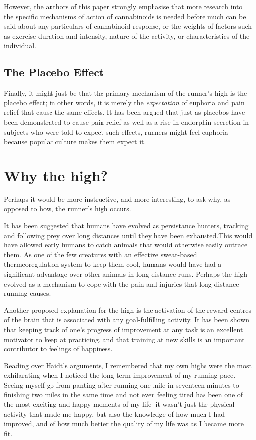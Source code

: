\documentclass[]{article}
\begin{document}
	However, the authors of this paper strongly emphasise that more research into the specific mechanisms of action of cannabinoids is needed before much can be said about any particulars of cannabinoid response, or the weights of factors such as exercise duration and intensity, nature of the activity, or characteristics of the individual. 
	
	\subsection{The Placebo Effect}
		Finally, it might just be that the primary mechanism of the runner's high is the placebo effect; in other words, it is merely the \emph{expectation} of euphoria and pain relief that cause the same effects. It has been argued \citep{placebo} that just as placebos have been demonstrated to cause pain relief as well as a rise in endorphin secretion in subjects who were told to expect such effects, runners might feel euphoria because popular culture makes them expect it.		
		
\section{Why the high?}
	Perhaps it would be more instructive, and more interesting, to ask why, as opposed to how, the runner's high occurs.
	
	It has been suggested \citep{hunt} that humans have evolved as persistance hunters, tracking and following prey over long distances until they have been exhausted.This would have allowed early humans to catch animals that would otherwise easily outrace them. As one of the few creatures with an effective sweat-based thermeoregulation system to keep them cool, humans would have had a significant advantage over other animals in long-distance runs. Perhaps the high evolved as a mechanism to cope with the pain and injuries that long distance running causes.
	
	Another proposed explanation for the high is the activation of the reward centres of the brain that is associated with any goal-fulfilling activity. It has been shown \citep{happiness} that keeping track of one's progress of improvement at any task is an excellent motivator to keep at practicing, and that training at new skills is an important contributor to feelings of happiness.
	
	Reading over Haidt's arguments, I remembered that my own highs were the most exhilarating  when I noticed the long-term improvement of my running pace. Seeing myself go from panting after running one mile in seventeen minutes to finishing two miles in the same time and not even feeling tired has been one of the most exciting and happy moments of my life- it wasn't just the physical activity that made me happy, but also the knowledge of how much I had improved, and of how much better the quality of my life was as I became more fit.
	
\end{document}
